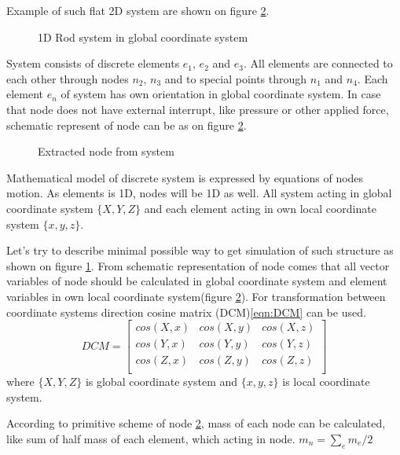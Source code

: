 Example of such flat 2D system are shown on figure \ref{fig:nodeExtract}.
\begin{figure}[H]
  \centering
      
  \caption{1D Rod system in global coordinate system}\label{fig:rodSystem}      
\end{figure} 
System consists of discrete elements $e_1$, $e_2$ and $e_3$. All elements are
connected to each other through nodes $n_2$, $n_3$ and to special points through
$n_1$ and $n_4$. Each element $e_n$ of system has own orientation in global
coordinate system. 
In case that node does not have external interrupt, like pressure or other
 applied force, schematic represent of node can be as on figure
 \ref{fig:nodeExtract}.\par
\begin{figure}[H]
  \centering
      
  \caption{Extracted node from system}\label{fig:nodeExtract}
\end{figure}
Mathematical model of discrete system is expressed by equations of nodes motion.
As elements is 1D, nodes will be 1D as well. All system acting in global
coordinate system $\{X, Y, Z\}$ and each element acting in own local coordinate
system $\{x,y,z\}$.
\par
Let's try to describe minimal possible way to get simulation of such structure
 as shown on figure \ref{fig:rodSystem}. From schematic representation of node
 comes that all vector variables of node should be calculated in global
 coordinate system and element variables in own local coordinate system(figure
 \ref{fig:nodeExtract}). For transformation between coordinate systems direction
 cosine matrix (DCM)\eqref{eqn:DCM} can be used.
\begin{equation}\label{eqn:DCM}
  DCM= \begin{bmatrix}
    cos(X,x)&cos(X,y)&cos(X,z)\\
    cos(Y,x)&cos(Y,y)&cos(Y,z)\\
    cos(Z,x)&cos(Z,y)&cos(Z,z)\\
   \end{bmatrix} 
\end{equation}
where $\{X, Y, Z\}$ is global coordinate system and $\{x,y,z\}$ is local coordinate
system.\par According to primitive scheme of node \ref{fig:nodeExtract}, mass of
each node can be calculated, like sum of half mass of each element, which acting
in node. $m_n=\sum_{e}m_e/2$\par